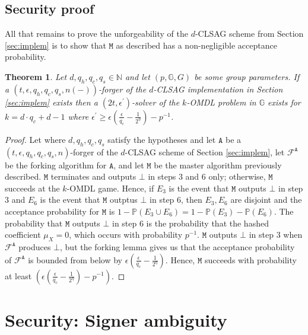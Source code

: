 \documentclass{article}
\theoremstyle{plain}
\newtheorem{theorem}{Theorem}[section]
\theoremstyle{definition}
\begin{document}
\subsection{Security proof}

All that remains to prove the unforgeability of the $d$-CLSAG scheme from Section \ref{sec:implem} is to show that $\texttt{M}$ as described has a non-negligible acceptance probability.

\begin{theorem}
Let $d, q_h, q_c, q_s \in \mathbb{N}$  and let $(p,\mathbb{G},G)$ be some group parameters. If a $(t, \epsilon, q_h, q_c, q_s, n(-))$-forger of the $d$-CLSAG implementation in Section \ref{sec:implem} exists then a $(2t, \epsilon^\prime)$-solver of the $k$-OMDL problem in $\mathbb{G}$ exists for $k = d\cdot q_c + d - 1$ where $\epsilon^\prime \geq \epsilon\left(\frac{\epsilon}{q_c} - \frac{1}{2^\eta}\right) - p^{-1}$.
\end{theorem}

\begin{proof}
Let where $d, q_h, q_c, q_s$ satisfy the hypotheses and let $\texttt{A}$ be a $(t, \epsilon, q_h, q_c, q_s, n)$-forger of the $d$-CLSAG scheme of Section \ref{sec:implem}, let $\mathcal{F}^{\texttt{A}}$ be the forking algorithm for $\texttt{A}$, and let $\texttt{M}$ be the master algorithm previously described. $\texttt{M}$ terminates and outputs $\bot$ in steps $3$ and $6$ only; otherwise, $\texttt{M}$ succeeds at the $k$-OMDL game. Hence, if $E_3$ is the event that $\texttt{M}$ outputs $\bot$ in step $3$ and $E_6$ is the event that $\texttt{M}$ outptus $\bot$ in step $6$, then $E_3, E_6$ are disjoint and the acceptance probability for $\texttt{M}$ is $1 - \mathbb{P}(E_3 \cup E_6) =  1 - \mathbb{P}(E_3) - \mathbb{P}(E_6)$. The probability that $\texttt{M}$ outputs $\bot$ in step $6$ is the probability that the hashed coefficient $\mu_X = 0$, which occurs with probability $p^{-1}$.  $\texttt{M}$ outputs $\bot$ in step $3$ when $\mathcal{F}^{\texttt{A}}$ produces $\bot$, but the forking lemma gives us that the acceptance probability of $\mathcal{F}^\texttt{A}$ is bounded from below by $\epsilon\left(\frac{\epsilon}{q_c} - \frac{1}{2^\eta}\right)$. Hence, $\texttt{M}$ succeeds with probability at least $ \left(\epsilon\left(\frac{\epsilon}{q_c} - \frac{1}{2^\eta}\right) - p^{-1}\right)$.
\end{proof}



\section{Security: Signer ambiguity}
\end{document}
